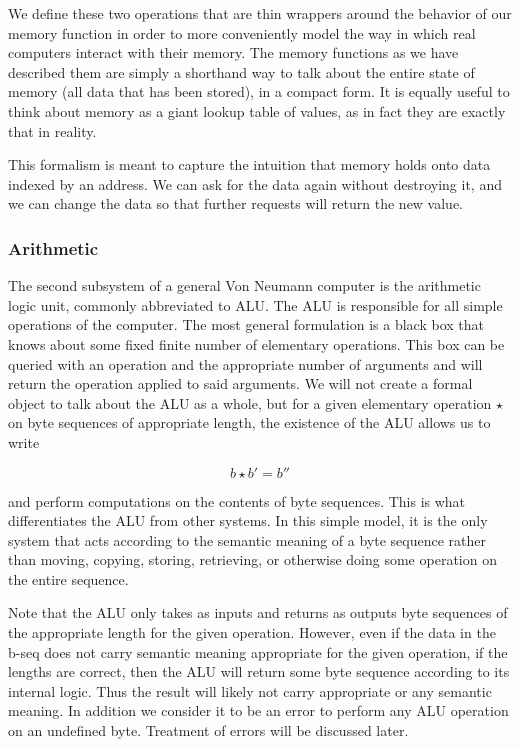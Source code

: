 \documentclass[11pt]{article}
\begin{document}
We define these two operations that are thin wrappers around the
behavior of our memory function in order to more conveniently model the
way in which real computers interact with their memory. The memory
functions as we have described them are simply a shorthand way to talk
about the entire state of memory (all data that has been stored), in a
compact form. It is equally useful to think about memory as a giant
lookup table of values, as in fact they are exactly that in reality.

This formalism is meant to capture the intuition that memory holds
onto data indexed by an address. We can ask for the data again without
destroying it, and we can change the data so that further requests
will return the new value.
\subsubsection{Arithmetic}
\label{sec:org8e1eec3}

The second subsystem of a general Von Neumann computer is the
arithmetic logic unit, commonly abbreviated to ALU. The ALU is
responsible for all simple operations of the computer. The most
general formulation is a black box that knows about some fixed finite
number of elementary operations. This box can be queried with an
operation and the appropriate number of arguments and will return the
operation applied to said arguments. We will not create a formal
object to talk about the ALU as a whole, but for a given elementary
operation \(\star\) on byte sequences of appropriate length, the
existence of the ALU allows us to write

\[
b \star b' = b''
\]

and perform computations on the contents of byte sequences. This is what
differentiates the ALU from other systems. In this simple model, it is
the only system that acts according to the semantic meaning of a byte
sequence rather than moving, copying, storing, retrieving, or
otherwise doing some operation on the entire sequence.

Note that the ALU only takes as inputs and returns as outputs byte
sequences of the appropriate length for the given operation. However,
even if the data in the b-seq does not carry semantic meaning
appropriate for the given operation, if the lengths are correct, then
the ALU will return some byte sequence according to its internal
logic. Thus the result will likely not carry appropriate or any
semantic meaning. In addition we consider it to be an error to perform
any ALU operation on an undefined byte. Treatment of errors will be
discussed later.
\end{document}
